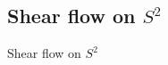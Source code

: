 \begin{comment}
\begin{frame}{Shear flow  on $S^1$: Stability analysis}
	\begin{figure}
		\centering
		\begin{minipage}{0.4\linewidth}
			\texttt{[image: Bilder/Stability\_analysis\_shearflow\_N=3\_dr0.1]}
		\end{minipage}
		\hspace{1cm}
		\begin{minipage}{0.4\linewidth}
			\centering
			\texttt{[image: Bilder/Stability\_analysis\_shearflow\_N=3\_dr1]}
		\end{minipage}
		\caption{Eigenvalue of matrix $A$ $N=3$}
	\end{figure}
	
	\begin{block}{Proposition 3}
		Sprectal method for $N=3$ is stable with for both small and large $D_r$.
	\end{block}
\end{frame}
	Inhalt...
\end{comment}


\subsection{Shear flow on $S^2$}
\begin{frame}
	\centering
	Shear flow on $S^2$
\end{frame}


